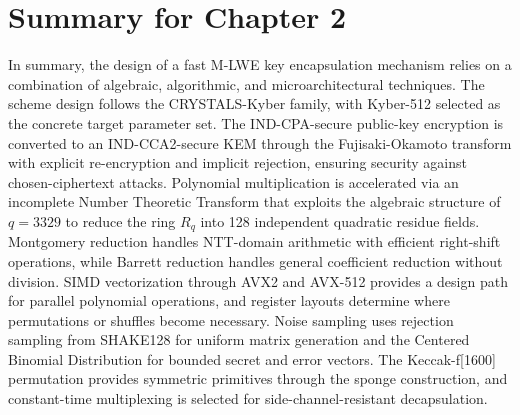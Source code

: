 \section{Summary for Chapter 2}
\label{sec:summary_chapter_2}

In summary, the design of a fast M-LWE key encapsulation mechanism relies on a combination of algebraic, algorithmic, and microarchitectural techniques. The scheme design follows the CRYSTALS-Kyber family, with Kyber-512 selected as the concrete target parameter set. The IND-CPA-secure public-key encryption is converted to an IND-CCA2-secure KEM through the Fujisaki-Okamoto transform with explicit re-encryption and implicit rejection, ensuring security against chosen-ciphertext attacks. Polynomial multiplication is accelerated via an incomplete Number Theoretic Transform that exploits the algebraic structure of $q = 3329$ to reduce the ring $R_q$ into 128 independent quadratic residue fields. Montgomery reduction handles NTT-domain arithmetic with efficient right-shift operations, while Barrett reduction handles general coefficient reduction without division. SIMD vectorization through AVX2 and AVX-512 provides a design path for parallel polynomial operations, and register layouts determine where permutations or shuffles become necessary. Noise sampling uses rejection sampling from SHAKE128 for uniform matrix generation and the Centered Binomial Distribution for bounded secret and error vectors. The Keccak-f[1600] permutation provides symmetric primitives through the sponge construction, and constant-time multiplexing is selected for side-channel-resistant decapsulation.
